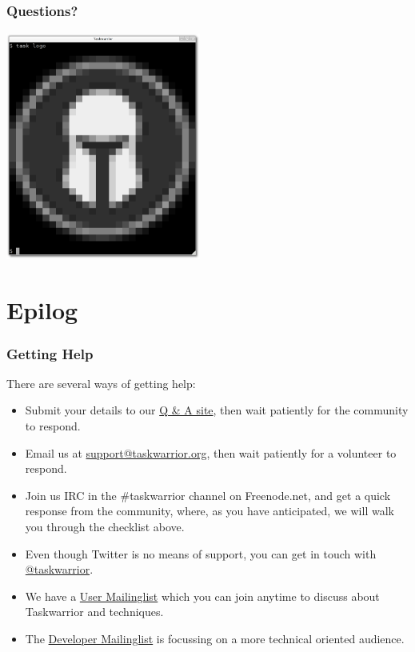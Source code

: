 \documentclass[t,handout]{beamer}
\begin{document}
\begin{frame}[fragile]\frametitle{Questions?}
    \vfill
    \begin{center}
        \includegraphics[width=6.4cm,height=7.5cm]{task_logo.png}
    \end{center}
\end{frame}

\section{Epilog}

\begin{frame}[fragile]\frametitle{Getting Help}
    \vfill
    There are several ways of getting help:

    \begin{itemize}
        \item Submit your details to our \href{https://answers.tasktools.org}{Q \& A site}, then wait patiently for the community to respond.
        \item Email us at \href{mailto:support@taskwarrior.org}{support@taskwarrior.org}, then wait patiently for a volunteer to respond.
        \item Join us IRC in the \#taskwarrior channel on Freenode.net, and get a quick response from the community, where, as you have anticipated, we will walk you through the checklist above.
        \item Even though Twitter is no means of support, you can get in touch with \href{https://twitter.com/taskwarrior}{@taskwarrior}.
        \item We have a \href{https://groups.google.com/forum/\#!forum/taskwarrior-user}{User Mailinglist} which you can join anytime to discuss about Taskwarrior and techniques.
        \item The \href{https://groups.google.com/forum/\#!forum/taskwarrior-dev}{Developer Mailinglist} is focussing on a more technical oriented audience.
    \end{itemize}
\end{frame}
\end{document}
